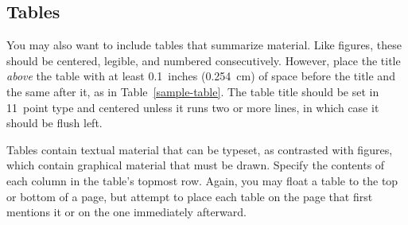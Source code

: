 \documentclass[11pt,letterpaper]{article}
\begin{document}
\subsection{Tables} 
 
You may also want to include tables that summarize material. Like 
figures, these should be centered, legible, and numbered consecutively. 
However, place the title {\it above\/} the table with at least 
0.1~inches (0.254~cm) of space before the title and the same after 
it, as in Table~\ref{sample-table}. The table title should be set in
11~point type and centered unless it runs two or more lines, in which
case it should be flush left.

Tables contain textual material that can be typeset, as contrasted 
with figures, which contain graphical material that must be drawn. 
Specify the contents of each column in the table's topmost row. Again,
you may float a table to the top or bottom of a page, but attempt to 
place each table on the page that first mentions it or on the one
immediately afterward. 


\def\w{$\oplus$}
\def\b{$\ominus$}
\def\h{$\odot$}
\end{document}
